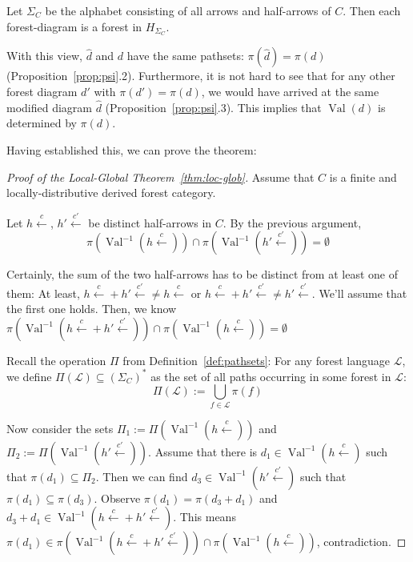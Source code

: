 \documentclass[sigplan,9pt]{acmart}\settopmatter{printfolios=true,printccs=false,printacmref=false}
\newcounter{thm}
\newcounter{theorem}
\theoremstyle{definition}
\newcommand{\La}[0]{{\mathcal{L}}}
\newcommand{\carrow}[3]{#3 \xleftarrow{#2} #1 }
\begin{document}
Let $\Sigma_C$ be the alphabet consisting of all arrows and half-arrows of $C$.
Then each forest-diagram is a forest in $H_{\Sigma_C}$.

With this view, $\widehat{d}$ and $d$ have the same pathsets: $\pi(\widehat{d}) = \pi(d)$ (Proposition~\ref{prop:psi}.2).
Furthermore, it is not hard to see that for any other forest diagram $d'$ with $\pi(d') = \pi(d)$, we would have arrived at the same modified diagram $\widehat{d}$  (Proposition~\ref{prop:psi}.3).
This implies that $\operatorname{Val}(d)$ is determined by $\pi(d)$. %

Having established this, we can prove the theorem:
\begin{proof}[Proof of the Local-Global Theorem~\ref{thm:loc-glob}]
Assume that $C$ is a finite and locally-distributive derived forest category.

Let $\carrow{}{c}h$, $\carrow{}{c'}{h'}$ be distinct half-arrows in $C$.
By the previous argument, $$\pi(\operatorname{Val}^{-1}(\carrow{}{c}h)) \cap \pi(\operatorname{Val}^{-1}(\carrow{}{c'}{h'})) = \emptyset$$

Certainly, the sum of the two half-arrows has to be distinct from at least one of them:
At least, $\carrow{}{c}h + \carrow{}{c'}{h'} \neq \carrow{}{c}h$ or $\carrow{}{c}h + \carrow{}{c'}{h'} \neq \carrow{}{c'}{h'}$.
We'll assume that the first one holds.
Then, we know
$\pi(\operatorname{Val}^{-1}(\carrow{}{c}h + \carrow{}{c'}{h'})) \cap \pi(\operatorname{Val}^{-1}(\carrow{}{c}h)) = \emptyset$

Recall the operation $\Pi$ from Definition~\ref{def:pathsets}:
For any forest language $\La$, we define $\Pi(\La)\subseteq (\Sigma_C)^*$ as the set of all paths occurring in some forest in $\La$:
$$\Pi(\La) := \bigcup_{f \in \La} \pi(f)$$

Now consider the sets
$\Pi_1 := \Pi(\operatorname{Val}^{-1}(\carrow{}{c}h))$ and 
$\Pi_2 := \Pi(\operatorname{Val}^{-1}(\carrow{}{c'}{h'}))$.
Assume that there is $d_1 \in \operatorname{Val}^{-1}(\carrow{}{c}h)$ such that $\pi(d_1) \subseteq \Pi_2$.
Then we can find $d_3 \in \operatorname{Val}^{-1}(\carrow{}{c'}{h'})$ such that $\pi(d_1) \subseteq \pi(d_3)$.
Observe $\pi(d_1) = \pi(d_3 + d_1)$ and $d_3 + d_1 \in \operatorname{Val}^{-1}(\carrow{}{c}h + \carrow{}{c'}{h'})$.
This means $\pi(d_1) \in \pi(\operatorname{Val}^{-1}(\carrow{}{c}h + \carrow{}{c'}{h'})) \cap \pi(\operatorname{Val}^{-1}(\carrow{}{c}h))$, contradiction.



\end{proof}
\end{document}
